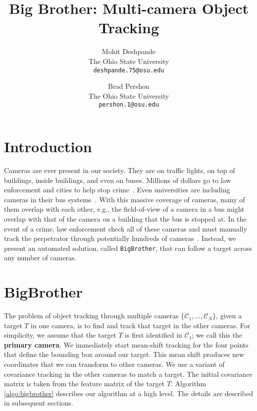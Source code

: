 \documentclass{article}
\begin{document}
\title{Big Brother: Multi-camera Object Tracking}

\author{
  Mohit Deshpande\\
  The Ohio State University\\
  \texttt{deshpande.75@osu.edu}
  \and
  Brad Pershon\\
  The Ohio State University\\
  \texttt{pershon.1@osu.edu}
}

\date{}

\maketitle


\section{Introduction}
Cameras are ever present in our society. They are on traffic lights, on top of buildings, inside buildings, and even on buses. Millions of dollars go to law enforcement and cities to help stop crime~\cite{surveillance}. Even universities are including cameras in their bus systems~\cite{cabs}. With this massive coverage of cameras, many of them overlap with each other, e.g., the field-of-view of a camera in a bus might overlap with that of the camera on a building that the bus is stopped at. In the event of a crime, law enforcement check all of these cameras and must manually track the perpetrator through potentially hundreds of cameras~\cite{surveillance}. Instead, we present an automated solution, called \texttt{BigBrother}, that can follow a target across any number of cameras. 

\section{BigBrother}
\label{sec:bigbrother}
The problem of object tracking through multiple cameras $\{\mathcal{C}_1,\dots,\mathcal{C}_N\}$, given a target $T$ in one camera, is to find and track that target in the other cameras. For simplicity, we assume that the target $T$ is first identified in $\mathcal{C}_1$; we call this the \textbf{primary camera}. We immediately start mean-shift tracking for the four points that define the bounding box around our target. This mean shift produces new coordinates that we can transform to other cameras. We use a variant of covariance tracking in the other cameras to match a target. The initial covariance matrix is taken from the feature matrix of the target $T$. Algorithm \ref{algo:bigbrother} describes our algorithm at a high level. The details are described in subsequent sections.
\end{document}
